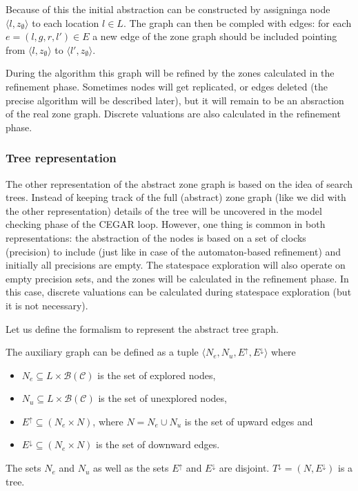 Because of this the initial abstraction can be constructed by assigninga node $\langle l, z_{\emptyset} \rangle$ to each location $l \in L$. The graph can then be compled with edges: for each $e=(l,g,r,l') \in E$ a new edge of the zone graph should be included pointing from $\langle l, z_{\emptyset} \rangle$ to $\langle l', z_{\emptyset} \rangle$.


During the algorithm this graph will be refined by the zones calculated in the refinement phase. Sometimes nodes will get replicated, or edges deleted (the precise algorithm will be described later), but it will remain to be an absraction of the real zone graph. Discrete valuations are also calculated in the refinement phase.


 

\subsubsection{Tree representation}
The other representation of the abstract zone graph is based on the idea of search trees. Instead of keeping track of the full (abstract) zone graph (like we did with the other representation) details of the tree will be uncovered in the model checking phase of the CEGAR loop. However, one thing is common in both representations:  the abstraction of the nodes is based on a set of clocks (precision) to include (just like in case of the automaton-based refinement) and initially all precisions are empty. The statespace exploration will also operate on empty precision sets, and the zones will be calculated in the refinement phase. In this case, discrete valuations can be calculated during statespace exploration (but it is not necessary).

Let us define the formalism to represent the abstract tree graph.

\begin{dfn}
	The auxiliary graph can be defined as a tuple $\langle N_e, N_u, E^\uparrow, E^\downarrow \rangle$ where
	\begin{itemize}
		\item $N_e \subseteq L \times \mathcal{B}(\mathcal{C})$ is the set of explored nodes,
		\item $N_u \subseteq L \times \mathcal{B}(\mathcal{C})$  is the set of unexplored nodes,
		\item $E^\uparrow \subseteq (N_e \times N)$, where $N = N_e \cup N_u$ is the set of upward edges and
		\item $E^\downarrow \subseteq (N_e \times N)$  is the set of downward edges.
	\end{itemize}
	 The sets $N_e$ and $N_u$ as well as the sets $E^\uparrow$ and $E^\downarrow$ are disjoint. $T^\downarrow=(N,E^\downarrow)$ is a tree.
\end{dfn}
 
